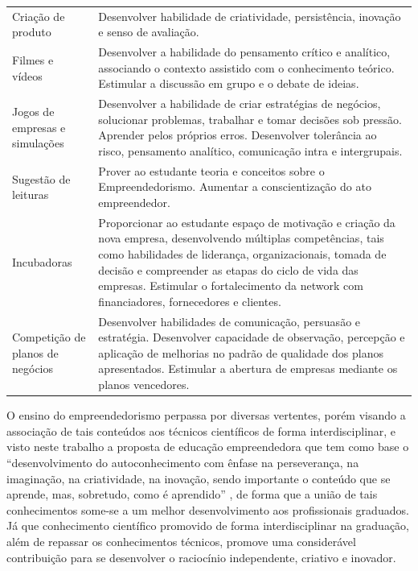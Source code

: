 \begin{center}
\begin{longtable}{p{3.5cm}p{11.0cm}}
Criação de produto & Desenvolver habilidade de criatividade, persistência, inovação e senso de
avaliação. \\ 

Filmes e vídeos & Desenvolver a habilidade do pensamento crítico e analítico, associando o
contexto assistido com o conhecimento teórico. Estimular a discussão em grupo e o debate de ideias. \\ 

Jogos de empresas e simulações & Desenvolver a habilidade de criar estratégias de negócios, solucionar
problemas, trabalhar e tomar decisões sob pressão. Aprender pelos próprios erros. Desenvolver tolerância ao risco, pensamento analítico, comunicação intra e intergrupais. \\ 

Sugestão de leituras & Prover ao estudante teoria e conceitos sobre o Empreendedorismo. Aumentar a conscientização do ato empreendedor. \\ 
Incubadoras & Proporcionar ao estudante espaço de motivação e criação da nova empresa, desenvolvendo múltiplas competências, tais como habilidades de liderança, organizacionais, tomada de decisão e compreender as etapas do ciclo de vida das empresas. Estimular o fortalecimento da network com financiadores, fornecedores e clientes. \\

Competição de planos de negócios & Desenvolver habilidades de comunicação, persuasão e estratégia.
Desenvolver capacidade de observação, percepção e aplicação de melhorias no padrão de qualidade dos planos apresentados. Estimular a abertura de empresas mediante os planos vencedores. \\ 

\end{longtable}
\end{center}



O ensino do empreendedorismo perpassa por diversas vertentes, porém visando a associação de tais conteúdos aos técnicos científicos de forma interdisciplinar, e visto neste trabalho a proposta de educação empreendedora que tem como base o “desenvolvimento do autoconhecimento com ênfase na perseverança, na imaginação, na criatividade, na inovação, sendo importante o conteúdo que se aprende, mas, sobretudo, como é aprendido” \cite{souza_disseminacao_2001}, de forma que a união de tais conhecimentos some-se a um melhor desenvolvimento aos profissionais graduados. Já que conhecimento científico promovido de forma interdisciplinar na graduação, além de repassar os conhecimentos técnicos, promove  uma considerável contribuição para se desenvolver o raciocínio independente, criativo e inovador.

